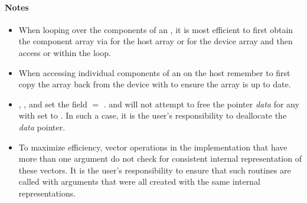 \paragraph{\bf Notes}

\begin{itemize}

\item
  When looping over the components of an  , it is
  most efficient to first obtain the component array via
   for the host array or \newline
   for the device array and then access
   or  within the loop.

\item
  When accessing individual components of an   on
  the host remember to first copy the array
  back from the device with 
  to ensure the array is up to date.

\item
  {\warn}, ,
  and  set the field
   $=$ .
   and 
  will not attempt to free the pointer {\em data} for any  with
   set to . In such a case, it is the user's responsibility to
  deallocate the {\em data} pointer.

\item
  {\warn}To maximize efficiency, vector operations in the {\nvecopenmpdev} implementation
  that have more than one  argument do not check for
  consistent internal representation of these vectors. It is the user's
  responsibility to ensure that such routines are called with 
  arguments that were all created with the same internal representations.

\end{itemize}
